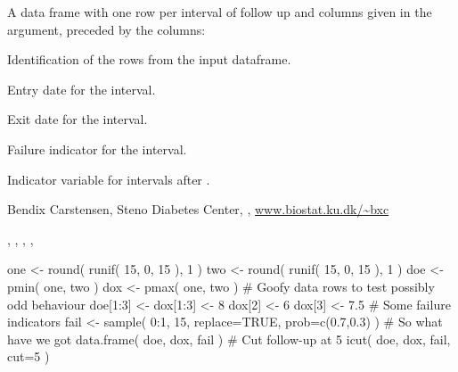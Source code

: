 \begin{Value}
A data frame with one row per interval of follow up and columns given
in the  argument, preceded by the columns:
\begin{ldescription}
\item[\code{Expand}] Identification of the rows from the input dataframe.
\item[\code{Enter}] Entry date for the interval.
\item[\code{Exit}] Exit date for the interval.
\item[\code{Fail}] Failure indicator for the interval.
\item[\code{Time}] Indicator variable for intervals after .
\end{ldescription}
\end{Value}
\begin{Author}\relax
Bendix Carstensen, Steno Diabetes Center,
, \url{www.biostat.ku.dk/~bxc}
\end{Author}
\begin{SeeAlso}\relax
{},
,
,
,
\end{SeeAlso}
\begin{Examples}
\begin{ExampleCode}
one <- round( runif( 15, 0, 15 ), 1 )
two <- round( runif( 15, 0, 15 ), 1 )
doe <- pmin( one, two )
dox <- pmax( one, two )
# Goofy data rows to test possibly odd behaviour
doe[1:3] <- dox[1:3] <- 8
dox[2] <- 6
dox[3] <- 7.5
# Some failure indicators
fail <- sample( 0:1, 15, replace=TRUE, prob=c(0.7,0.3) )
# So what have we got
data.frame( doe, dox, fail )
# Cut follow-up at 5
icut( doe, dox, fail, cut=5 )
\end{ExampleCode}
\end{Examples}

